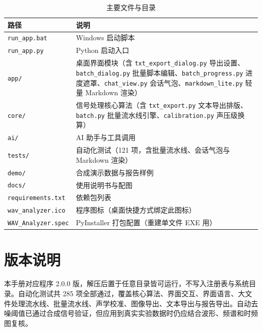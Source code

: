 \documentclass[UTF8,a4paper,12pt,scheme=chinese]{ctexart}
\begin{document}
\begin{table}[htbp]
\centering
\caption{主要文件与目录}
\begin{tabular}{@{}>{\raggedright\arraybackslash}p{3.9cm}>{\raggedright\arraybackslash}p{10.1cm}@{}}
\toprule
路径 & 说明 \\
\midrule
\texttt{run\_app.bat} & Windows 启动脚本 \\
\texttt{run\_app.py} & Python 启动入口 \\
\texttt{app/} & 桌面界面模块（含 \texttt{txt\_export\_dialog.py} 导出设置、\texttt{batch\_dialog.py} 批量脚本编辑、\texttt{batch\_progress.py} 进度遮罩、\texttt{chat\_view.py} 会话气泡、\texttt{markdown\_lite.py} 轻量 Markdown 渲染） \\
\texttt{core/} & 信号处理核心算法（含 \texttt{txt\_export.py} 文本导出排版、\texttt{batch.py} 批量流水线引擎、\texttt{calibration.py} 声压级换算） \\
\texttt{ai/} & AI 助手与工具调用 \\
\texttt{tests/} & 自动化测试（121 项，含批量流水线、会话气泡与 Markdown 渲染） \\
\texttt{demo/} & 合成演示数据与报告样例 \\
\texttt{docs/} & 使用说明书与配图 \\
\texttt{requirements.txt} & 依赖包列表 \\
\texttt{wav\_analyzer.ico} & 程序图标（桌面快捷方式绑定此图标） \\
\texttt{WAV\_Analyzer.spec} & PyInstaller 打包配置（重建单文件 EXE 用） \\
\bottomrule
\end{tabular}
\end{table}

\section{版本说明}

本手册对应程序 2.0.0 版，解压后置于任意目录皆可运行，不写入注册表与系统目录。自动化测试共 285 项全部通过，覆盖核心算法、界面交互、界面语言、大文件处理流水线、批量流水线、声学校准、图像导出、文本导出与报告导出。自动去噪阈值已通过合成信号验证，但应用到真实实验数据时仍应结合波形、频谱和时频图复核。
\end{document}
